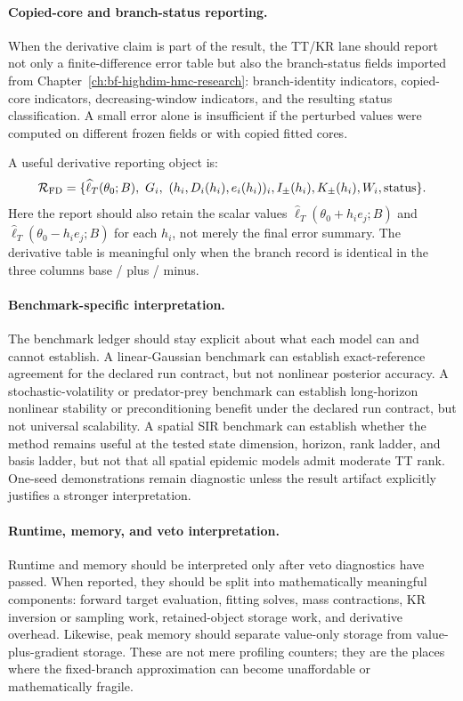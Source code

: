 \paragraph{Copied-core and branch-status reporting.}
When the derivative claim is part of the result, the TT/KR lane should report not
only a finite-difference error table but also the branch-status fields imported
from Chapter~\ref{ch:bf-highdim-hmc-research}: branch-identity indicators,
copied-core indicators, decreasing-window indicators, and the resulting status
classification.  A small error alone is insufficient if the perturbed values were
computed on different frozen fields or with copied fitted cores.

A useful derivative reporting object is:
\begin{equation}
  \mathcal R_{\rm FD}=
  \{\widehat\ell_T(\theta_0;B),\ G_i,\ (h_i,D_i(h_i),e_i(h_i))_i,
    I_\pm(h_i),K_\pm(h_i),W_i,\text{status}\}.
  \label{eq:bf-hd-validation-fd-report-object}
\end{equation}
Here the report should also retain the scalar values
\(\widehat\ell_T(\theta_0+h_i e_j;B)\) and
\(\widehat\ell_T(\theta_0-h_i e_j;B)\) for each \(h_i\), not merely the final
error summary.  The derivative table is meaningful only when the branch record is
identical in the three columns base / plus / minus.

\paragraph{Benchmark-specific interpretation.}
The benchmark ledger should stay explicit about what each model can and cannot
establish.  A linear-Gaussian benchmark can establish exact-reference agreement
for the declared run contract, but not nonlinear posterior accuracy.  A
stochastic-volatility or predator-prey benchmark can establish long-horizon
nonlinear stability or preconditioning benefit under the declared run contract,
but not universal scalability.  A spatial SIR benchmark can establish whether the
method remains useful at the tested state dimension, horizon, rank ladder, and
basis ladder, but not that all spatial epidemic models admit moderate TT rank.
One-seed demonstrations remain diagnostic unless the result artifact explicitly
justifies a stronger interpretation.

\paragraph{Runtime, memory, and veto interpretation.}
Runtime and memory should be interpreted only after veto diagnostics have passed.
When reported, they should be split into mathematically meaningful components:
forward target evaluation, fitting solves, mass contractions, KR inversion or
sampling work, retained-object storage work, and derivative overhead.  Likewise,
peak memory should separate value-only storage from value-plus-gradient storage.
These are not mere profiling counters; they are the places where the fixed-branch
approximation can become unaffordable or mathematically fragile.

